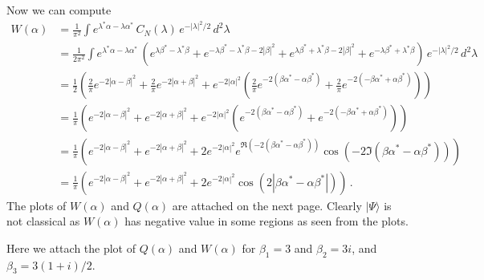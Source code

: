 \documentclass[11pt, oneside]{book}
\theoremstyle{break}
\theoremstyle{break}
\begin{document}
Now we can compute
\begin{align*}
W(\alpha) 
&= \frac{1}{\pi^2}\int e^{\lambda^* \alpha - \lambda \alpha^*} \, C_N(\lambda) \, e^{-|\lambda|^2/2}\, d^2 \lambda\\
&= \frac{1}{2\pi^2}\int e^{\lambda^* \alpha - \lambda \alpha^*} \, \left( 
e^{\lambda \beta^* - \lambda^* \beta}+
e^{-\lambda \beta^* - \lambda^* \beta - 2|\beta|^2}+
e^{\lambda\beta^* +\lambda^*\beta- 2|\beta|^2} + 
e^{-\lambda \beta^* + \lambda^* \beta} \right)
\, e^{-|\lambda|^2/2}\, d^2 \lambda\\
&=\frac{1}{2}\left( \frac{2}{\pi}e^{-2|\alpha-\beta|^2}+ \frac{2}{\pi}e^{-2|\alpha + \beta|^2} + e^{-2|\alpha|^2}\left(\frac{2}{\pi}e^{-2(\beta \alpha^* - \alpha \beta^*)} + \frac{2}{\pi}e^{-2(-\beta \alpha^* + \alpha\beta^*)}  \right) \right)\\
&=\frac{1}{\pi}\left(e^{-2|\alpha-\beta|^2}+ e^{-2|\alpha + \beta|^2} + e^{-2|\alpha|^2}\left(e^{-2(\beta \alpha^* - \alpha \beta^*)} +e^{-2(-\beta \alpha^* + \alpha\beta^*)}  \right) \right)\\
&= \frac{1}{\pi}\left(e^{-2|\alpha-\beta|^2}+ e^{-2|\alpha + \beta|^2} +2 e^{-2|\alpha|^2}e^{\Re(-2 (\beta \alpha^* - \alpha\beta^*))} \cos(-2 \Im(\beta \alpha^* - \alpha\beta^*)) \right)\\
&= \frac{1}{\pi}\left(e^{-2|\alpha-\beta|^2}+ e^{-2|\alpha + \beta|^2} +2 e^{-2|\alpha|^2} \cos(2|\beta \alpha^* - \alpha\beta^*|) \right)\,.
\end{align*}
The plots of $W(\alpha)$ and $Q(\alpha)$ are attached on the next page. Clearly $|\Psi\rangle$ is not classical as $W(\alpha)$ has negative value in some regions as seen from the plots.

\newpage

Here we attach the plot of $Q(\alpha)$ and $W(\alpha)$ for $\beta_1 = 3$ and $\beta_2 = 3i$, and $\beta_3 = 3(1+i)/2$.  \\
\end{document}
